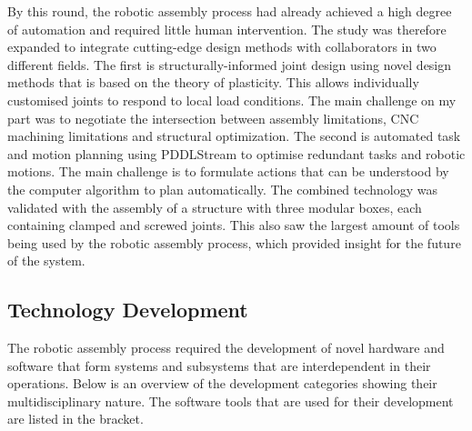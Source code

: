 \begin{description}[style=standard]
    \item [Exploration Round 5 - CantiBox Demonstrator] By this round, the robotic assembly process had already achieved a high degree of automation and required little human intervention. The study was therefore expanded to integrate cutting-edge design methods with collaborators in two different fields. The first is structurally-informed joint design using novel design methods that is based on the theory of plasticity. This allows individually customised joints to respond to local load conditions. The main challenge on my part was to negotiate the intersection between assembly limitations, CNC machining limitations and structural optimization. The second is automated task and motion planning using PDDLStream to optimise redundant tasks and robotic motions. The main challenge is to formulate actions that can be understood by the computer algorithm to plan automatically. The combined technology was validated with the assembly of a structure with three modular boxes, each containing clamped and screwed joints. This also saw the largest amount of tools being used by the robotic assembly process, which provided insight for the future of the system. 
 
\end{description}
\subsection{Technology Development}
\label{subsection:methodology-technology-development}

The robotic assembly process required the development of novel hardware and software that form systems and subsystems that are interdependent in their operations. Below is an overview of the development categories showing their multidisciplinary nature. The software tools that are used for their development are listed in the bracket. 

